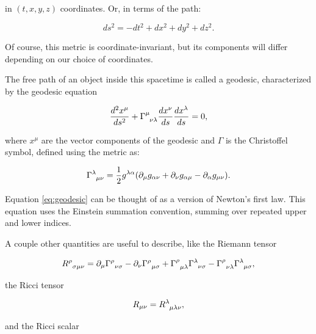 \documentclass[twoside, openright]{RadboudReport}
\newcommand{\mn}{{\mu\nu}}
\begin{document}
in $(t,x,y,z)$ coordinates. Or, in terms of the path:

\begin{equation}
	ds^2 = -dt^2 + dx^2 + dy^2+ dz^2.
\end{equation}

Of course, this metric is coordinate-invariant, but its components will differ depending on our choice of coordinates. \newline

The free path of an object inside this spacetime is called a geodesic, characterized by the geodesic equation

\begin{equation}
	\frac{d^2x^\mu}{ds^2} + \Gamma^\mu_{\hphantom{\lambda}\nu\lambda}\frac{dx^\nu}{ds}\frac{dx^\lambda}{ds} = 0,
	\label{eq:geodesic}
\end{equation}

where $x^\mu$ are the vector components of the geodesic and $\Gamma$ is the Christoffel symbol, defined using the metric as:

\begin{equation} 
	\Gamma^{\lambda}_{\hphantom{\lambda}\mu\nu} = \frac{1}{2}g^{\lambda\alpha}(\partial_{\mu}g_{\alpha\nu}+\partial_{\nu}g_{\alpha\mu}-\partial_{\alpha}g_{\mu\nu}).
	\label{eq:csymbols}
\end{equation}

Equation \ref{eq:geodesic} can be thought of as a version of Newton's first law. This equation uses the Einstein summation convention, summing over repeated upper and lower indices.\newline

A couple other quantities are useful to describe, like the Riemann tensor

\begin{equation*}
	R^{\rho}_{\hphantom{\lambda}\sigma\mu\nu} = \partial_{\mu}\Gamma^{\rho}_{\hphantom{\lambda}\nu\sigma} - \partial_{\nu}\Gamma^{\rho}_{\hphantom{\lambda}\mu\sigma} + \Gamma^{\rho}_{\hphantom{\lambda}\mu\lambda}\Gamma^{\lambda}_{\hphantom{\lambda}\nu\sigma} - \Gamma^{\rho}_{\hphantom{\lambda}\nu\lambda}\Gamma^{\lambda}_{\hphantom{\lambda}\mu\sigma},
\end{equation*}

the Ricci tensor

\begin{equation*}
	R_\mn = R^{\lambda}_{\hphantom{\lambda}\mu\lambda\nu},
\end{equation*}

and the Ricci scalar
\end{document}
